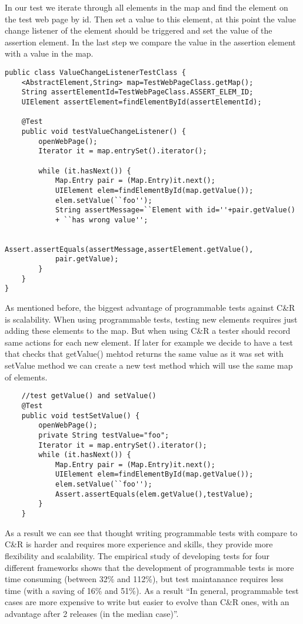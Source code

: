       In our test we iterate through all elements in the map and find the
      element on the test web page by id. Then set a value to this element,
      at this point the value change listener of the element should be triggered and set the value
      of the assertion element. In the last step we compare the value in the
      assertion element with a value in the map.
			
\begin{lstlisting}
public class ValueChangeListenerTestClass {
	<AbstractElement,String> map=TestWebPageClass.getMap();
	String assertElementId=TestWebPageClass.ASSERT_ELEM_ID;
	UIElement assertElement=findElementById(assertElementId);
       
    @Test
    public void testValueChangeListener() {
    	openWebPage();
        Iterator it = map.entrySet().iterator();
          
        while (it.hasNext()) {
        	Map.Entry pair = (Map.Entry)it.next();
        	UIElement elem=findElementById(map.getValue());
        	elem.setValue(``foo'');
        	String assertMessage=``Element with id=''+pair.getValue()
        	+ ``has wrong value'';
        
        	Assert.assertEquals(assertMessage,assertElement.getValue(),
        	pair.getValue);
        }
    }
}
\end{lstlisting}
  
      As mentioned before, the biggest advantage of programmable tests against
      C\&R is scalability. When using programmable tests, testing new elements
      requires just adding these elements to the map. But when using C\&R a
      tester should record same actions for each new element. If later for
      example we decide to have a test that checks that getValue() mehtod
      returns the same value as it was set with setValue method we can create
      a new test method which will use the same map of elements. 

\begin{lstlisting}
	//test getValue() and setValue()
	@Test
	public void testSetValue() {
    	openWebPage();
    	private String testValue="foo";
    	Iterator it = map.entrySet().iterator();
    	while (it.hasNext()) {
    		Map.Entry pair = (Map.Entry)it.next();
			UIElement elem=findElementById(map.getValue());
            elem.setValue(``foo'');  
            Assert.assertEquals(elem.getValue(),testValue);        
        }
    }
\end{lstlisting}

      As a result we can see that thought writing programmable tests with
      compare to C\&R is harder and requires more experience and skills, they
      provide more flexibility and scalability. The empirical study
       of developing tests for four different frameworks shows that the development of programmable tests is more time
      consuming (between 32\% and 112\%), but test maintanance requires less
      time (with a saving of 16\% and 51\%). As a result ``In general, programmable test cases are more
expensive to write but easier to evolve than C\&R ones, with an advantage after
2 releases (in the median case)''.\cite{CaptureReplay7}

